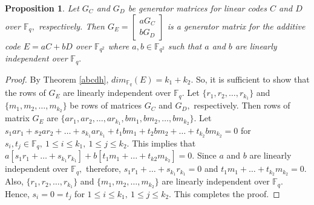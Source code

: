 \documentclass[sn-mathphys-num]{sn-jnl}%
\theoremstyle{thmstyleone}%
\newtheorem{proposition}[theorem]{Proposition}%
\theoremstyle{thmstyletwo}%
\theoremstyle{thmstylethree}%
\begin{document}
\begin{proposition}
	Let $G_C$ and $G_D$ be generator matrices for linear codes $C$ and $D$ over $\mathbb{F}_q,$  respectively. Then $G_E=\begin{bmatrix}
		aG_C\\
		bG_D
	\end{bmatrix}$ is a generator matrix for the additive code $E=aC+bD$  over $\mathbb{F}_{q^2}$ where  $a,b\in \mathbb{F}_{q^2}$  such that $a$ and $b$ are linearly independent over  $\mathbb{F}_q.$
\end{proposition}
\begin{proof}
	By  Theorem \ref{abcdh}, $dim_{\mathbb{F}_q}(E)=k_1+k_2.$ So, it is sufficient to show that the rows of $G_E$ are linearly independent over $\mathbb{F}_q.$  Let $\{r_1,r_2,\dots,r_{k_1}\}$ and $\{m_1,m_2,\dots, m_{k_2}\}$ be rows of matrices $G_C$ and $G_D,$ respectively. Then rows of matrix $G_E$ are $\{ar_1,ar_2,\dots,ar_{k_1}, bm_1,bm_2,\dots, bm_{k_2}\}$.  Let $s_1ar_1+s_2ar_2+\dots+s_{k_1}ar_{k_1}+t_1bm_1+t_2bm_2+\dots+t_{k_2}bm_{k_2}=0$ for $s_i,t_j\in \mathbb{F}_q,\ 1\leq i\leq k_1,\ 1\leq j\leq k_2.$ This implies that $a[s_1r_1+\dots +s_{k_1}r_{k_1}]+b[t_1m_1+\dots+t_{k2}m_{k_2}]=0.$ Since $a$ and $b$ are linearly independent over  $\mathbb{F}_q,$ therefore, $s_1r_1+\dots +s_{k_1}r_{k_1}=0$ and $t_1m_1+\dots+t_{k_2}m_{k_2}=0.$ Also, $\{r_1,r_2,\dots,r_{k_1}\}$ and $\{m_1,m_2,\dots, m_{k_2}\}$ are linearly independent over $\mathbb{F}_q$. Hence, $s_i=0=t_j$ for $1\leq i\leq k_1,\ 1\leq j\leq k_2.$ This completes the proof.
\end{proof}
\end{document}
